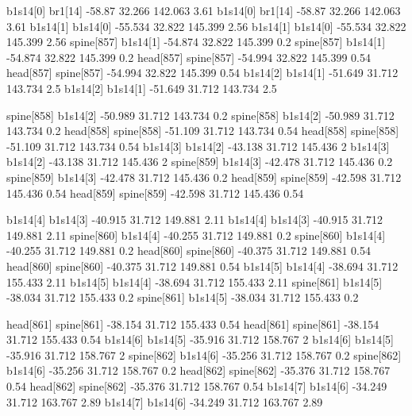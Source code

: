b1s14[0]    br1[14]    -58.87    32.266    142.063    3.61
b1s14[0]    br1[14]    -58.87    32.266    142.063    3.61
b1s14[1]    b1s14[0]    -55.534    32.822    145.399    2.56
b1s14[1]    b1s14[0]    -55.534    32.822    145.399    2.56
spine[857]    b1s14[1]    -54.874    32.822    145.399    0.2
spine[857]    b1s14[1]    -54.874    32.822    145.399    0.2
head[857]    spine[857]    -54.994    32.822    145.399    0.54
head[857]    spine[857]    -54.994    32.822    145.399    0.54
b1s14[2]    b1s14[1]    -51.649    31.712    143.734    2.5
b1s14[2]    b1s14[1]    -51.649    31.712    143.734    2.5


spine[858]    b1s14[2]    -50.989    31.712    143.734    0.2
spine[858]    b1s14[2]    -50.989    31.712    143.734    0.2
head[858]    spine[858]    -51.109    31.712    143.734    0.54
head[858]    spine[858]    -51.109    31.712    143.734    0.54
b1s14[3]    b1s14[2]    -43.138    31.712    145.436    2
b1s14[3]    b1s14[2]    -43.138    31.712    145.436    2
spine[859]    b1s14[3]    -42.478    31.712    145.436    0.2
spine[859]    b1s14[3]    -42.478    31.712    145.436    0.2
head[859]    spine[859]    -42.598    31.712    145.436    0.54
head[859]    spine[859]    -42.598    31.712    145.436    0.54


b1s14[4]    b1s14[3]    -40.915    31.712    149.881    2.11
b1s14[4]    b1s14[3]    -40.915    31.712    149.881    2.11
spine[860]    b1s14[4]    -40.255    31.712    149.881    0.2
spine[860]    b1s14[4]    -40.255    31.712    149.881    0.2
head[860]    spine[860]    -40.375    31.712    149.881    0.54
head[860]    spine[860]    -40.375    31.712    149.881    0.54
b1s14[5]    b1s14[4]    -38.694    31.712    155.433    2.11
b1s14[5]    b1s14[4]    -38.694    31.712    155.433    2.11
spine[861]    b1s14[5]    -38.034    31.712    155.433    0.2
spine[861]    b1s14[5]    -38.034    31.712    155.433    0.2


head[861]    spine[861]    -38.154    31.712    155.433    0.54
head[861]    spine[861]    -38.154    31.712    155.433    0.54
b1s14[6]    b1s14[5]    -35.916    31.712    158.767    2
b1s14[6]    b1s14[5]    -35.916    31.712    158.767    2
spine[862]    b1s14[6]    -35.256    31.712    158.767    0.2
spine[862]    b1s14[6]    -35.256    31.712    158.767    0.2
head[862]    spine[862]    -35.376    31.712    158.767    0.54
head[862]    spine[862]    -35.376    31.712    158.767    0.54
b1s14[7]    b1s14[6]    -34.249    31.712    163.767    2.89
b1s14[7]    b1s14[6]    -34.249    31.712    163.767    2.89


